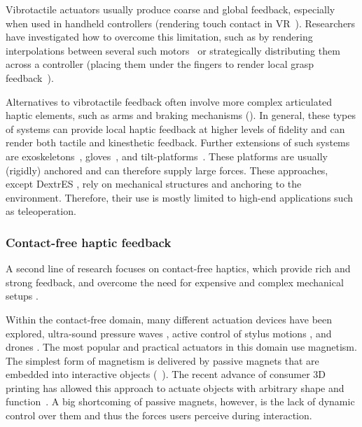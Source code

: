 Vibrotactile actuators usually produce coarse and global feedback, especially when used in handheld controllers (\eg rendering touch contact in VR~\cite{Benko2016,Choi2018}). Researchers have investigated how to overcome this limitation, such as by rendering interpolations between several such motors~\cite{israr2011tactile} or strategically distributing them across a controller (\eg placing them under the fingers to render local grasp feedback~\cite{Lee2019Torc}).

Alternatives to vibrotactile feedback often involve more complex articulated haptic elements, such as arms and braking mechanisms (\eg \cite{Massie94, Stamper1997, VanDerLinde2002, Araujo2016, zoller2019assessment, Sinclair2019Capstan}). In general, these types of systems can provide local haptic feedback at higher levels of fidelity and can render both tactile and kinesthetic feedback. Further extensions of such systems are exoskeletons~\cite{Gu2016, Choi2016}, gloves~\cite{Cybergrasp, hinchet2018dextres}, and tilt-platforms~\cite{Prattichizzo2013, Kim2016}. These platforms are usually (rigidly) anchored and can therefore supply large forces. These approaches, except DextrES \cite{hinchet2018dextres}, rely on mechanical structures and anchoring to the environment.
Therefore, their use is mostly limited to high-end applications such as teleoperation.

\subsubsection{Contact-free haptic feedback}
A second line of research focuses on contact-free haptics, which provide rich and strong feedback, and overcome the need for expensive and complex mechanical setups \cite{brink2014factors}. 

Within the contact-free domain, many different actuation devices have been explored, \eg ultra-sound pressure waves \cite{hoshi2010noncontact}, active control of stylus motions \cite{kianzad2018harold}, and drones \cite{heo2018thor}. The most popular and practical actuators in this domain use magnetism. The simplest form of magnetism is delivered by passive magnets that are embedded into interactive objects (\eg~\cite{yamaoka2013depend}). The recent advance of consumer 3D printing has allowed this approach to actuate objects with arbitrary shape and function~\cite{zheng2019mechamagnets, ogata2018magneto}. A big shortcoming of passive magnets, however, is the lack of dynamic control over them and thus the forces users perceive during interaction.


